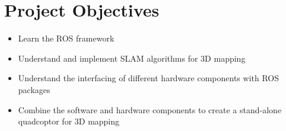 \chapter{Project Objectives}

\begin{itemize}
\item Learn the ROS framework
\item Understand and implement SLAM algorithms for 3D mapping
\item Understand the interfacing of different hardware components with ROS packages
\item Combine the software and hardware components to create a stand-alone quadcoptor for 3D mapping
\end{itemize}